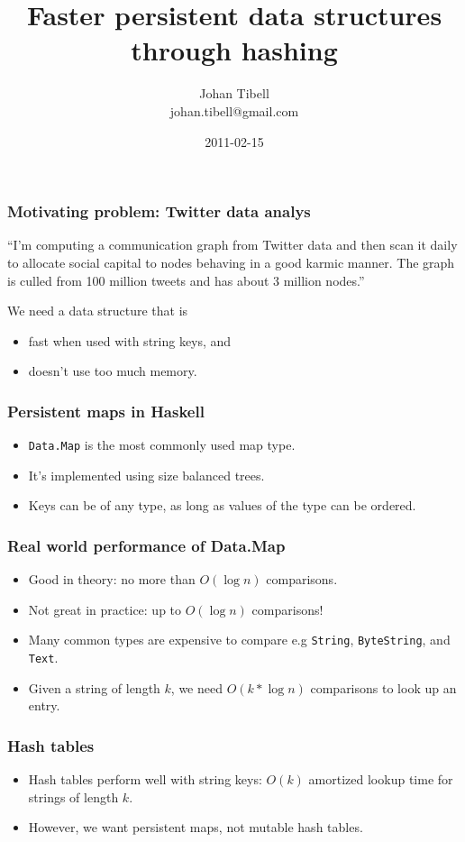 \documentclass{beamer}
\title{Faster persistent data structures through hashing}
\author{Johan Tibell\\johan.tibell@gmail.com}
\date{2011-02-15}
\begin{document}
\lstset{language=Haskell}

\frame{\titlepage}

\begin{frame}
  \frametitle{Motivating problem: Twitter data analys}

  ``I'm computing a communication graph from Twitter data and then
  scan it daily to allocate social capital to nodes behaving in a good
  karmic manner.  The graph is culled from 100 million tweets and has
  about 3 million nodes.''

  \bigskip
  We need a data structure that is
  \begin{itemize}
  \item fast when used with string keys, and
  \item doesn't use too much memory.
  \end{itemize}
\end{frame}

\begin{frame}
  \frametitle{Persistent maps in Haskell}

  \begin{itemize}
  \item \lstinline!Data.Map! is the most commonly used map type.
  \item It's implemented using size balanced trees.
  \item Keys can be of any type, as long as values of the type can be
    ordered.
  \end{itemize}
\end{frame}

\begin{frame}
  \frametitle{Real world performance of Data.Map}

  \begin{itemize}
  \item Good in theory: no more than $O(\log n)$ comparisons.
  \item Not great in practice: up to $O(\log n)$ comparisons!
  \item Many common types are expensive to compare e.g
    \lstinline!String!, \lstinline!ByteString!, and \lstinline!Text!.
  \item Given a string of length $k$, we need $O(k*\log n)$
    comparisons to look up an entry.
  \end{itemize}
\end{frame}

\begin{frame}
  \frametitle{Hash tables}
  \begin{itemize}
  \item Hash tables perform well with string keys: $O(k)$ amortized
    lookup time for strings of length $k$.
  \item However, we want persistent maps, not mutable hash tables.
  \end{itemize}
\end{frame}
\end{document}

